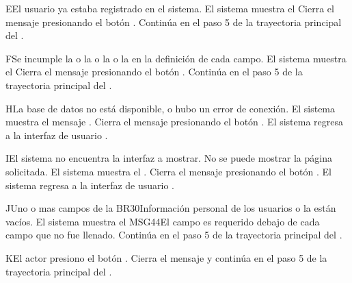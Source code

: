 \begin{UCtrayectoriaA}{E}{El usuario ya estaba registrado en el sistema.}
	\UCpaso El sistema muestra el  
	\UCpaso[\UCactor] Cierra el mensaje presionando el botón .
	\UCpaso Continúa en el paso 5 de la trayectoria principal del .
\end{UCtrayectoriaA}

\begin{UCtrayectoriaA}{F}{Se incumple la  o la   o la  o la  en la definición de cada campo.}
	\UCpaso El sistema muestra el 
	\UCpaso[\UCactor] Cierra el mensaje presionando el botón .
	\UCpaso Continúa en el paso 5 de la trayectoria principal del .
\end{UCtrayectoriaA}



\begin{UCtrayectoriaA}{H}{La base de datos no está disponible, o hubo un error de conexión.}
	\UCpaso El sistema muestra el mensaje .
	\UCpaso[\UCactor] Cierra el mensaje presionando el botón .
	\UCpaso El sistema regresa a la interfaz de usuario .
\end{UCtrayectoriaA}

\begin{UCtrayectoriaA}{I}{El sistema no encuentra la interfaz a mostrar.}
	\UCpaso No se puede mostrar la página solicitada.
	\UCpaso El sistema muestra el .
	\UCpaso[\UCactor] Cierra el mensaje presionando el botón .
	\UCpaso El sistema regresa a la interfaz de usuario .
\end{UCtrayectoriaA}
\begin{UCtrayectoriaA}{J}{Uno o mas campos de la {BR30}{Información personal de los usuarios} o la  están vacíos.}
	\UCpaso El sistema muestra el {MSG44}{El campo es requerido} debajo de cada campo que no fue llenado. 
	\UCpaso	Continúa en el paso 5 de la trayectoria principal del .
\end{UCtrayectoriaA}
\begin{UCtrayectoriaA}{K}{El actor presiono el botón .}
	\UCpaso Cierra el mensaje y continúa en el paso 5 de la trayectoria principal del .	
\end{UCtrayectoriaA}
